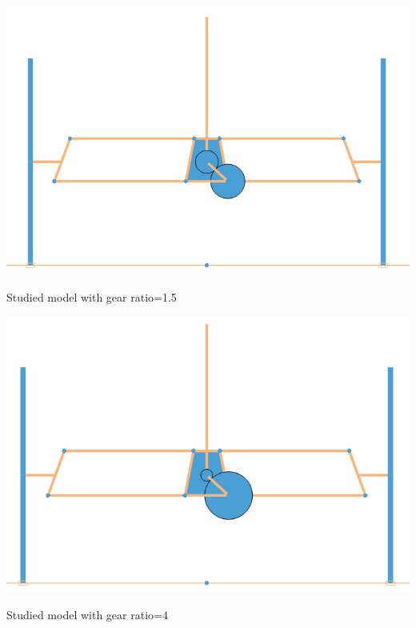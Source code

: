 \newpage
\begin{marginfigure}[5cm]
	\includegraphics[width=1.15\linewidth]{figs/05/sim/gear15_2}
	\caption{Studied model with gear ratio=1.5}
\end{marginfigure}
\begin{marginfigure}[5cm]
	\includegraphics[width=1.15\linewidth]{figs/05/sim/gear4_2}
	\caption{Studied model with gear ratio=4}
\end{marginfigure}
